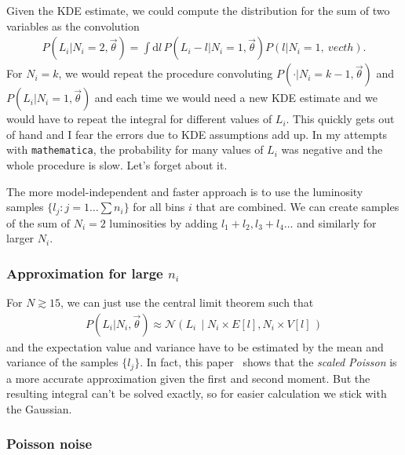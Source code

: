 \documentclass[a4,12pt]{article}
\newcommand{\given}[2]{\left(#1\, \middle| #2 \, \right)}
\newcommand{\gaussian}{\ensuremath{\mathcal{N}}}
\newcommand{\Lumi}{\ensuremath{L_i}}
\newcommand{\rmdx}[1]{\mbox{d} #1 \,} %
\newcommand{\vecth}{\ensuremath{{\vec{\theta}}}}
\begin{document}
Given the KDE estimate, we could compute the distribution for the sum
of two variables as the convolution
\begin{align}
  \label{eq:sum-of-2}
  P(\Lumi | N_i=2, \vecth) = \int \rmdx{l} P(\Lumi -l | N_i=1, \vecth) P(l | N_i=1, \
vecth).
\end{align}
For $N_i =k$, we would repeat the procedure convoluting $P(\cdot |
N_i=k-1, \vecth)$ and $P(\Lumi | N_i=1, \vecth)$ and each time we
would need a new KDE estimate and we would have to repeat the integral
for different values of $\Lumi$. This quickly gets out of hand and I
fear the errors due to KDE assumptions add up. In my attempts with
\texttt{mathematica}, the probability for many values of $\Lumi$ was
negative and the whole procedure is slow. Let's forget about it.

The more model-independent and faster approach is to use the
luminosity samples $\{l_j: j=1 \dots \sum n_i\}$ for all bins $i$ that
are combined. We can create samples of the sum of $N_i=2$ luminosities
by adding $l_1+l_2, l_3 + l_4 \dots$ and similarly for larger
$N_i$.

\subsubsection*{Approximation for large $n_i$}

For $N \gtrsim 15$, we can just use the central limit theorem
such that
\begin{align}
  \label{eq:clt}
  P(\Lumi | N_i, \vecth) \approx \gaussian \given{\Lumi}{N_i \times E[l], N_i \times V[l]}
\end{align}
and the expectation value and variance have to be estimated by the mean
and variance of the samples $\{l_j\}$. In fact, this paper~\cite{bohm_statistics_2014}
shows that the \emph{scaled Poisson} is a more accurate approximation
given the first and second moment. But the resulting integral can't be
solved exactly, so for easier calculation we stick with the Gaussian.

\subsubsection{Poisson noise}
\end{document}
